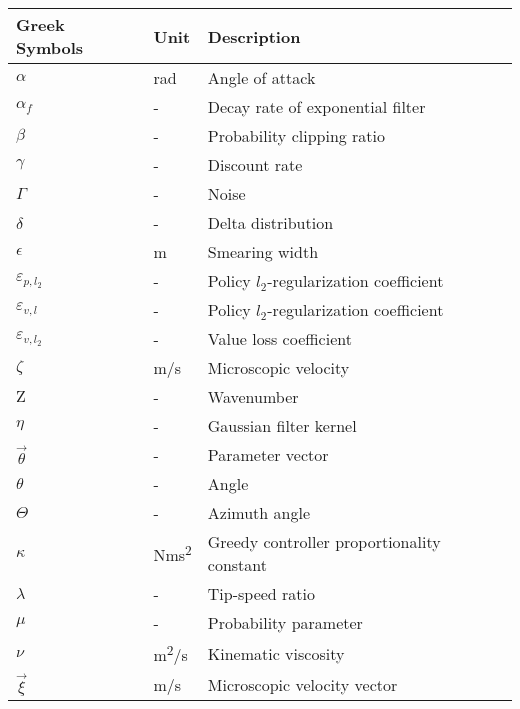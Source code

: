 \vspace{0.5cm}
\begin{longtable}{p{5cm}p{4cm}p{5cm}}
	Greek Symbols    	& Unit       		& Description             \\ \hline
	$\alpha$			& \si{rad}			& Angle of attack \\
	$\alpha_f$			& \si{-}			& Decay rate of exponential filter \\
	$\beta$				& \si{-}			& Probability clipping ratio \\
	$\gamma$			& \si{-}			& Discount rate \\
    $\Gamma$			& \si{-}			& Noise \\
	$\delta$			& \si{-}			& Delta distribution \\
	$\epsilon$			& \si{m}			& Smearing width \\
	$\varepsilon_{p,l_2}$& \si{-}			& Policy $l_2$-regularization coefficient \\ 
	$\varepsilon_{v,l}$& \si{-}				& Policy $l_2$-regularization coefficient \\ 
	$\varepsilon_{v,l_2}$& \si{-}			& Value loss coefficient \\ 
	$\zeta$				& \si{m/s}			& Microscopic velocity \\
    $\mathrm{Z}$		& \si{-}			& Wavenumber \\
	$\eta$				& \si{-}			& Gaussian filter kernel \\
	$\vec{\theta}$		& \si{-}			& Parameter vector \\
	$\theta$			& \si{-}			& Angle \\
	$\Theta$			& \si{-}			& Azimuth angle \\
	$\kappa$			& \si{Nms\squared}		& Greedy controller proportionality constant \\
	$\lambda$			& \si{-}			& Tip-speed ratio \\
    $\mu$               & \si{-}     		& Probability parameter \\
    $\nu$               & \si{m\squared/s}  & Kinematic viscosity  \\
    $\vec{\xi}$         & \si{m/s}      	& Microscopic velocity vector \\

\end{longtable}
